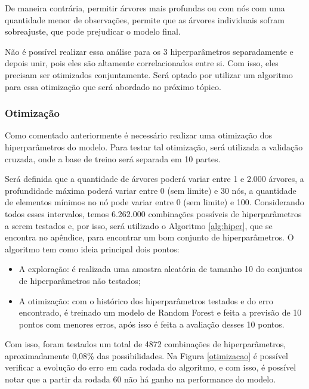 \documentclass[
	12pt,				%
	a4paper,		%
	oneside,    %
	chapter=TITLE,		   %
	section=TITLE,		   %
	subsection=TITLE,	   %
	subsubsection=TITLE, %
	english,			%
	french,				%
	spanish,			%
	brazil,				%
]{abntex2}
\begin{document}
De maneira contrária, permitir árvores mais profundas ou com nós com uma
quantidade menor de observações, permite que as árvores individuais
sofram sobreajuste, que pode prejudicar o modelo final.

Não é possível realizar essa análise para os 3 hiperparâmetros
separadamente e depois unir, pois eles são altamente correlacionados
entre si. Com isso, eles precisam ser otimizados conjuntamente. Será
optado por utilizar um algoritmo para essa otimização que será abordado
no próximo tópico.

\hypertarget{otimizauxe7uxe3o}{%
\subsubsection{Otimização}\label{otimizauxe7uxe3o}}

Como comentado anteriormente é necessário realizar uma otimização dos
hiperparâmetros do modelo. Para testar tal otimização, será utilizada a
validação cruzada, onde a base de treino será separada em 10 partes.

Será definida que a quantidade de árvores poderá variar entre 1 e 2.000
árvores, a profundidade máxima poderá variar entre 0 (sem limite) e 30
nós, a quantidade de elementos mínimos no nó pode variar entre 0 (sem
limite) e 100. Considerando todos esses intervalos, temos 6.262.000
combinações possíveis de hiperparâmetros a serem testados e, por isso,
será utilizado o Algoritmo \ref{alg:hiper}, que se encontra no apêndice,
para encontrar um bom conjunto de hiperparâmetros. O algoritmo tem como
ideia principal dois pontos:

\begin{itemize}
\item
  A exploração: é realizada uma amostra aleatória de tamanho 10 do
  conjuntos de hiperparâmetros não testados;
\item
  A otimização: com o histórico dos hiperparâmetros testados e do erro
  encontrado, é treinado um modelo de Random Forest e feita a previsão
  de 10 pontos com menores erros, após isso é feita a avaliação desses
  10 pontos.
\end{itemize}

Com isso, foram testados um total de 4872 combinações de
hiperparâmetros, aproximadamente 0,08\% das possibilidades. Na Figura
\ref{otimizacao} é possível verificar a evolução do erro em cada rodada
do algoritmo, e com isso, é possível notar que a partir da rodada 60 não
há ganho na performance do modelo.
\end{document}

